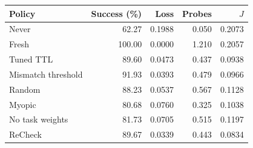 \begin{tabular}{lrrrr}
\toprule
Policy & Success (\%) & Loss & Probes & $J$ \\
\midrule
Never & 62.27 & 0.1988 & 0.050 & 0.2073 \\
Fresh & 100.00 & 0.0000 & 1.210 & 0.2057 \\
Tuned TTL & 89.60 & 0.0473 & 0.437 & 0.0938 \\
Mismatch threshold & 91.93 & 0.0393 & 0.479 & 0.0966 \\
Random & 88.23 & 0.0537 & 0.567 & 0.1128 \\
Myopic & 80.68 & 0.0760 & 0.325 & 0.1038 \\
No task weights & 81.73 & 0.0705 & 0.515 & 0.1197 \\
ReCheck & 89.67 & 0.0339 & 0.443 & 0.0834 \\
\bottomrule
\end{tabular}